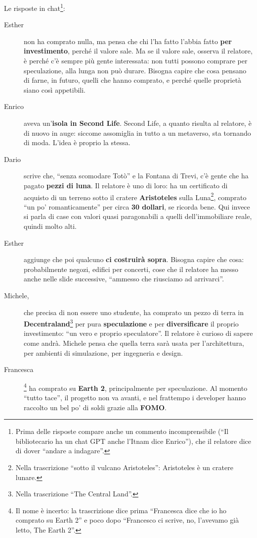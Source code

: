 Le risposte in chat\footnote{Prima delle risposte compare anche un commento
incomprensibile (``Il bibliotecario ha un chat GPT anche l'Itnam dice Enrico''),
che il relatore dice di dover ``andare a indagare''.}:
\begin{description}
  \item[Esther] non ha comprato nulla, ma pensa che chi l'ha fatto l'abbia fatto
        \textbf{per investimento}, perché il valore sale. Ma se il valore sale,
        osserva il relatore, è perché c'è sempre più gente interessata: non tutti
        possono comprare per speculazione, alla lunga non può durare. Bisogna
        capire che cosa pensano di farne, in futuro, quelli che hanno comprato, e
        perché quelle proprietà siano così appetibili.
  \item[Enrico] aveva un'\textbf{isola in Second Life}. Second Life, a quanto
        risulta al relatore, è di nuovo in auge: siccome assomiglia in tutto a un
        metaverso, sta tornando di moda. L'idea è proprio la stessa.
  \item[Dario] scrive che, ``senza scomodare Totò'' e la Fontana di Trevi, c'è
        gente che ha pagato \textbf{pezzi di luna}. Il relatore è uno di loro:
        ha un certificato di acquisto di un terreno sotto il cratere
        \textbf{Aristoteles} sulla Luna\footnote{Nella trascrizione ``sotto il
        vulcano Aristoteles'': Aristoteles è un cratere lunare.}, comprato ``un
        po' romanticamente'' per circa \textbf{30 dollari}, se ricorda bene. Qui
        invece si parla di case con valori quasi paragonabili a quelli
        dell'immobiliare reale, quindi molto alti.
  \item[Esther] aggiunge che poi qualcuno \textbf{ci costruirà sopra}. Bisogna
        capire che cosa: probabilmente negozi, edifici per concerti, cose che il
        relatore ha messo anche nelle slide successive, ``ammesso che riusciamo
        ad arrivarci''.
  \item[Michele,] che precisa di non essere uno studente, ha comprato un pezzo
        di terra in \textbf{Decentraland}\footnote{Nella trascrizione ``The
        Central Land''.} per pura \textbf{speculazione} e per
        \textbf{diversificare} il proprio investimento: ``un vero e proprio
        speculatore''. Il relatore è curioso di sapere come andrà. Michele pensa
        che quella terra sarà usata per l'architettura, per ambienti di
        simulazione, per ingegneria e design.
  \item[Francesca]\footnote{Il nome è incerto: la trascrizione dice prima
        ``Francesca dice che io ho comprato su Earth 2'' e poco dopo ``Francesco
        ci scrive, no, l'avevamo già letto, The Earth 2''.} ha comprato su
        \textbf{Earth 2}, principalmente per speculazione. Al momento ``tutto
        tace'', il progetto non va avanti, e nel frattempo i developer hanno
        raccolto un bel po' di soldi grazie alla \textbf{FOMO}.
\end{description}

